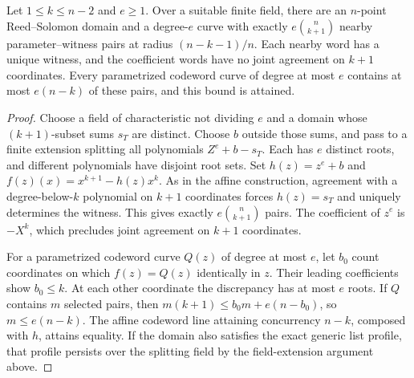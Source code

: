 \begin{corollary}
\label{cor:curve-endpoint-sharp}
Let $1\le k\le n-2$ and $e\ge1$. Over a suitable finite field, there
are an $n$-point Reed--Solomon domain and a degree-$e$ curve with
exactly $e\binom n{k+1}$ nearby parameter--witness pairs at radius
$(n-k-1)/n$. Each nearby word has a unique witness, and the coefficient
words have no joint agreement on $k+1$ coordinates. Every parametrized
codeword curve of degree at most $e$ contains at most $e(n-k)$ of
these pairs, and this bound is attained.
\end{corollary}
\begin{proof}
Choose a field of characteristic not dividing $e$ and a domain whose
$(k+1)$-subset sums $s_T$ are distinct. Choose $b$ outside those sums,
and pass to a finite extension splitting all polynomials
$Z^e+b-s_T$. Each has $e$ distinct roots, and different polynomials
have disjoint root sets. Set $h(z)=z^e+b$ and
$f(z)(x)=x^{k+1}-h(z)x^k$. As in the affine construction, agreement
with a degree-below-$k$ polynomial on $k+1$ coordinates forces
$h(z)=s_T$ and uniquely determines the witness. This gives exactly
$e\binom n{k+1}$ pairs. The coefficient of $z^e$ is $-X^k$, which
precludes joint agreement on $k+1$ coordinates.

For a parametrized codeword curve $Q(z)$ of degree at most $e$,
let $b_0$ count coordinates on which $f(z)=Q(z)$ identically in $z$.
Their leading coefficients show $b_0\le k$. At each other coordinate
the discrepancy has at most $e$ roots. If $Q$ contains $m$ selected
pairs, then $m(k+1)\le b_0m+e(n-b_0)$, so $m\le e(n-k)$.
The affine codeword line attaining concurrency $n-k$, composed with
$h$, attains equality. If the domain also satisfies the exact generic
list profile, that profile persists over the splitting field by the
field-extension argument above.
\end{proof}
